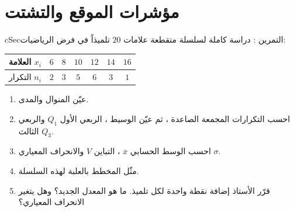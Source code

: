 \documentclass[12pt,a4paper]{article}
\newenvironment{BOX}[2]{\begin{otherlanguage}{english}\begin{arbox}{#1}{#2}}{\end{arbox}\end{otherlanguage}}
\newcounter{exo}
\newenvironment{tamrin}[1]{\stepcounter{exo}\begin{BOX}{cSec}{التمرين \theexo: #1}}{\end{BOX}}
\begin{document}
\section{مؤشرات الموقع والتشتت}
\begin{tamrin}{دراسة كاملة لسلسلة متقطعة}
علامات $20$ تلميذاً في فرض الرياضيات:
\begin{center}
\renewcommand{\arraystretch}{1.45}
\begin{tabular}{|c|c|c|c|c|c|c|}\hline
\cellcolor{cSec!12}العلامة $x_i$ & $6$ & $8$ & $10$ & $12$ & $14$ & $16$\\\hline
\cellcolor{cSec!12}التكرار $n_i$ & $2$ & $3$ & $5$ & $6$ & $3$ & $1$\\\hline
\end{tabular}
\end{center}
\begin{enumerate}
\item عيّن المنوال والمدى.
\item احسب التكرارات المجمعة الصاعدة ، ثم عيّن الوسيط ، الربعي الأول $Q_1$ والربعي الثالث $Q_3$.
\item احسب الوسط الحسابي $\overline x$ ، التباين $V$ والانحراف المعياري $\sigma$.
\item مثّل المخطط بالعلبة لهذه السلسلة.
\item قرّر الأستاذ إضافة نقطة واحدة لكل تلميذ. ما هو المعدل الجديد؟ وهل يتغير الانحراف المعياري؟
\end{enumerate}
\end{tamrin}
\end{document}
